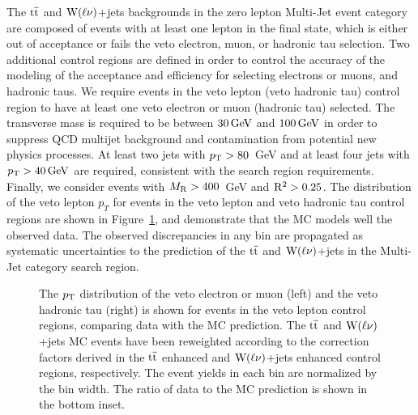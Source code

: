 The $\mathrm{t}\overline{\mathrm{t}}$ and $\mathrm{W}(\ell\nu)$+jets backgrounds in the zero lepton Multi-Jet event category are 
composed of events with at least one lepton in the final state, which is either out of 
acceptance or fails the veto electron, muon, or hadronic tau selection. 
Two additional control regions are defined in order to control the accuracy of the modeling of the 
acceptance and efficiency for selecting electrons or muons, and hadronic taus. 
We require events in the veto lepton (veto hadronic tau) control region to have at least one veto electron or muon
(hadronic tau) selected. The transverse mass is required to be between $30\,\text{Ge\hspace{-.08em}V}$ and $100\,\text{Ge\hspace{-.08em}V}$ in order to 
suppress QCD multijet background and contamination from potential new physics processes. At least two jets
with $p_{\mathrm{T}}>80$~GeV and at least four jets with $p_{\mathrm{T}}>40\,\text{Ge\hspace{-.08em}V}$ are required,
consistent with the search region requirements. Finally, we consider events with 
$M_\mathrm{R} > 400$~GeV and $\mathrm{R}^2>0.25$. The distribution of the veto lepton $p_{T}$ for events in the veto 
lepton and veto hadronic tau control regions are shown in Figure~\ref{fig:VetoLeptonCR_LepPt},
and demonstrate that the MC models well the observed data.
The observed discrepancies in any bin are propagated as systematic uncertainties to the 
prediction of the $\mathrm{t}\overline{\mathrm{t}}$ and $\mathrm{W}(\ell\nu)$+jets in the Multi-Jet category search region.

\begin{figure}[!htb] \centering
{}
\caption{ The $p_{\mathrm{T}}$ distribution of the veto electron or muon (left) and the veto hadronic tau (right)
is shown for events in the veto lepton control regions, comparing data with the MC prediction. The $\mathrm{t}\overline{\mathrm{t}}$ and 
$\mathrm{W}(\ell\nu)$+jets MC events have been reweighted according to the correction factors derived
in the $\mathrm{t}\overline{\mathrm{t}}$ enhanced and $\mathrm{W}(\ell\nu)$+jets enhanced control regions, respectively.  
The event yields in each bin are normalized by the bin width. The ratio of data to the MC prediction
is shown in the bottom inset.
}
\label{fig:VetoLeptonCR_LepPt}
\end{figure}

